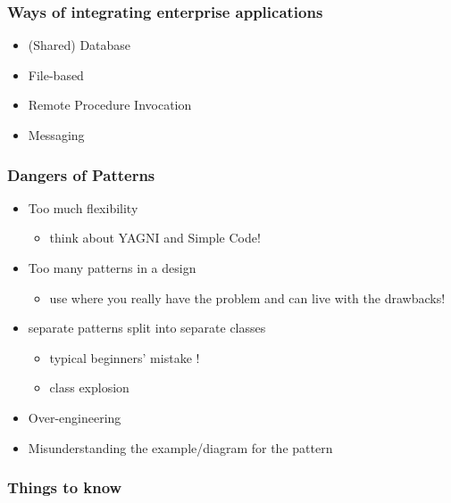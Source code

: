 \hypertarget{ways-of-integrating-enterprise-applications}{%
\subsubsection{Ways of integrating enterprise
applications}\label{ways-of-integrating-enterprise-applications}}

\begin{itemize}
\tightlist
\item
  (Shared) Database
\item
  File-based
\item
  Remote Procedure Invocation
\item
  Messaging
\end{itemize}


\hypertarget{dangers-of-patterns}{%
\subsubsection{Dangers of Patterns}\label{dangers-of-patterns}}

\begin{itemize}
\tightlist
\item
  Too much flexibility

  \begin{itemize}
  \tightlist
  \item
    think about YAGNI and Simple Code!
  \end{itemize}
\item
  Too many patterns in a design

  \begin{itemize}
  \tightlist
  \item
    use where you really have the problem and can live with the
    drawbacks!
  \end{itemize}
\item
  separate patterns split into separate classes

  \begin{itemize}
  \tightlist
  \item
    typical beginners' mistake !
  \item
    class explosion
  \end{itemize}
\item
  Over-engineering
\item
  Misunderstanding the example/diagram for the pattern
\end{itemize}

\hypertarget{things-to-know}{%
\subsubsection{Things to know}\label{things-to-know}}

